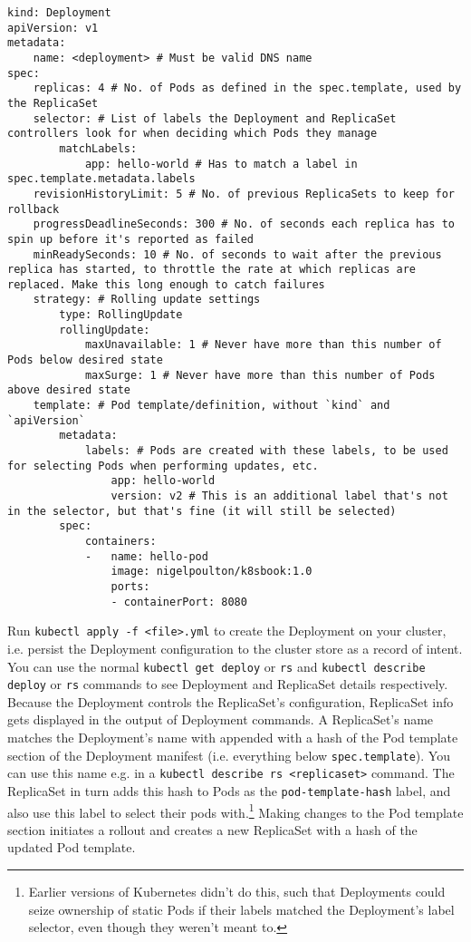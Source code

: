 \documentclass[8pt, table, xcdraw]{article}%
\begin{document}
\begin{lstlisting}
kind: Deployment
apiVersion: v1
metadata:
	name: <deployment> # Must be valid DNS name
spec:
    replicas: 4 # No. of Pods as defined in the spec.template, used by the ReplicaSet
    selector: # List of labels the Deployment and ReplicaSet controllers look for when deciding which Pods they manage
        matchLabels:
            app: hello-world # Has to match a label in spec.template.metadata.labels
    revisionHistoryLimit: 5 # No. of previous ReplicaSets to keep for rollback
    progressDeadlineSeconds: 300 # No. of seconds each replica has to spin up before it's reported as failed
    minReadySeconds: 10 # No. of seconds to wait after the previous replica has started, to throttle the rate at which replicas are replaced. Make this long enough to catch failures
    strategy: # Rolling update settings
        type: RollingUpdate
        rollingUpdate:
            maxUnavailable: 1 # Never have more than this number of Pods below desired state
            maxSurge: 1 # Never have more than this number of Pods above desired state
    template: # Pod template/definition, without `kind` and `apiVersion`
        metadata:
            labels: # Pods are created with these labels, to be used for selecting Pods when performing updates, etc.
                app: hello-world
                version: v2 # This is an additional label that's not in the selector, but that's fine (it will still be selected)
        spec:
            containers:
            -   name: hello-pod
                image: nigelpoulton/k8sbook:1.0
                ports:
                - containerPort: 8080
\end{lstlisting}

Run \lstinline{kubectl apply -f <file>.yml} to create the Deployment on your cluster, i.e. persist the Deployment configuration to the cluster store as a record of intent. You can use the normal \lstinline{kubectl get deploy} or \lstinline{rs} and \lstinline{kubectl describe deploy} or \lstinline{rs} commands to see Deployment and ReplicaSet details respectively. Because the Deployment controls the ReplicaSet’s configuration, ReplicaSet info gets displayed in the output of Deployment commands. A ReplicaSet's name matches the Deployment’s name with appended with a hash of the Pod template section of the Deployment manifest (i.e. everything below \lstinline{spec.template}). You can use this name e.g. in a \lstinline{kubectl describe rs <replicaset>} command. The ReplicaSet in turn adds this hash to Pods as the \lstinline{pod-template-hash} label, and also use this label to select their pods with.\footnote{Earlier versions of Kubernetes didn't do this, such that Deployments could seize ownership of static Pods if their labels matched the Deployment’s label selector, even though they weren't meant to.} Making changes to the Pod template section initiates a rollout and creates a new ReplicaSet with a hash of the updated Pod template.
\end{document}

